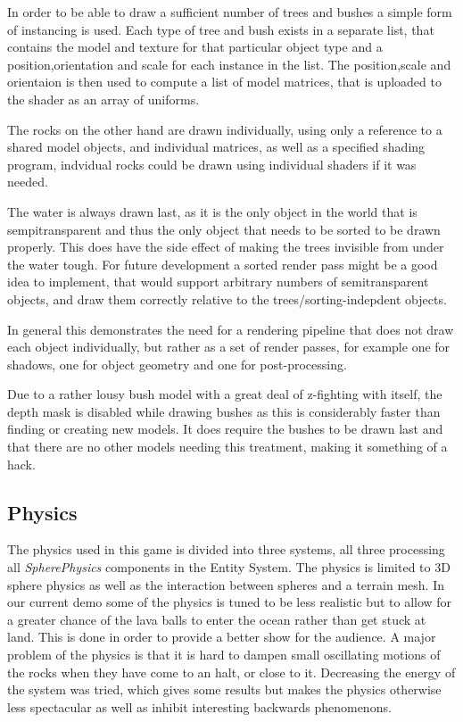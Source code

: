In order to be able to draw a sufficient number of trees and bushes a simple form of instancing is used. Each type of tree and bush exists in a separate list, that contains the model and texture for that particular object type and a position,orientation and scale for each instance in the list. The position,scale and orientaion is then used to compute a list of model matrices, that is uploaded to the shader as an array of uniforms.

The rocks on the other hand are drawn individually, using only a reference to a shared model objects, and individual matrices, as well as a specified shading program, indvidual rocks could be drawn using individual shaders if it was needed.

The water is always drawn last, as it is the only object in the world that is sempitransparent and thus the only object that needs to be sorted to be drawn properly. This does have the side effect of making the trees invisible from under the water tough. For future development a sorted render pass might be a good idea to implement, that would support arbitrary numbers of semitransparent objects, and draw them correctly relative to the trees/sorting-indepdent objects.

In general this demonstrates the need for a rendering pipeline that does not draw each object individually, but rather as a set of render passes, for example one for shadows, one for object geometry and one for post-processing.

Due to a rather lousy bush model with a great deal of z-fighting with itself, the depth mask is disabled while drawing bushes as this is considerably faster than finding or creating new models. It does require the bushes to be drawn last and that there are no other models needing this treatment, making it something of a hack.

\newpage
\subsection{Physics}
The physics used in this game is divided into three systems, all three processing all \textit{SpherePhysics} components in the Entity System. The physics is limited to 3D sphere physics as well as the interaction between spheres and a terrain mesh. In our current demo some of the physics is tuned to be less realistic but to allow for a greater chance of the lava balls to enter the ocean rather than get stuck at land. This is done in order to provide a better show for the audience. A major problem of the physics is that it is hard to dampen small oscillating motions of the rocks when they have come to an halt, or close to it. Decreasing the energy of the system was tried, which gives some results but makes the physics otherwise less spectacular as well as inhibit interesting backwards phenomenons.

